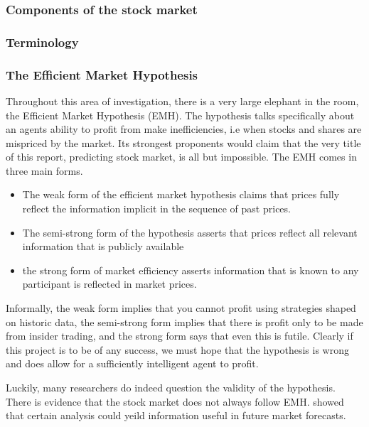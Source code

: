 \documentclass[a4paper,11pt]{article}
\begin{document}
\subsubsection{Components of the stock market}
\subsubsection{Terminology}
\subsubsection{The Efficient Market Hypothesis}

Throughout this area of investigation, there is a very large elephant in the room, the Efficient Market Hypothesis (EMH). The hypothesis talks specifically about an agents ability to profit from make inefficiencies, i.e when stocks and shares are mispriced by the market. Its strongest proponents would claim that the very title of this report, predicting stock market, is all but impossible. The EMH comes in three main forms.
\begin{itemize}
  \item The weak form of the efficient market hypothesis claims that prices fully
reflect the information implicit in the sequence of past prices. 

  \item The semi-strong form of the hypothesis asserts that prices reflect all relevant information that is publicly available
  
  \item the strong form of market efficiency asserts information that is known to any participant is reflected in market prices.
\end{itemize}
\cite{dimson1998brief}

Informally, the weak form implies that you cannot profit using strategies shaped on historic data, the semi-strong form implies that there is profit only to be made from insider trading, and the strong form says that even this is futile. Clearly if this project is to be of any success, we must hope that the hypothesis is wrong and does allow for a sufficiently intelligent agent to profit.

Luckily, many researchers do indeed question the validity of the hypothesis. There is evidence that the stock market does not always follow EMH. \cite[(Basu 1983)]{basu1983relationship} showed that certain analysis could yeild information useful in future market forecasts.
\end{document}

